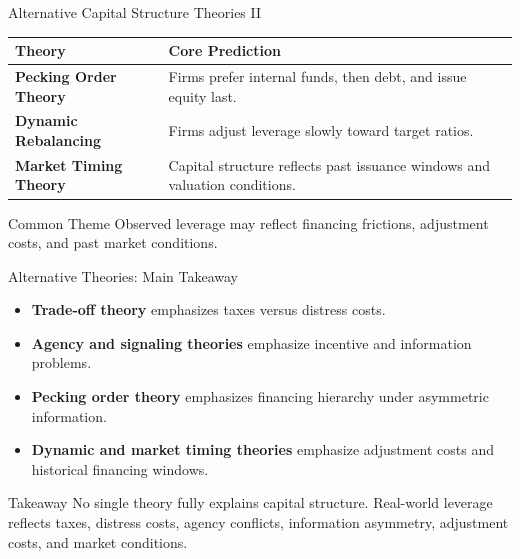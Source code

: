 \begin{frame}{Alternative Capital Structure Theories II}
\small

\begin{table}[ht]
\centering
\begin{tabular}{p{3.5cm}p{7.7cm}}
\toprule
\textbf{Theory} & \textbf{Core Prediction} \\
\midrule

\textbf{Pecking Order Theory}
{ \parencite{myers1984corporate}}
& Firms prefer internal funds, then debt, and issue equity last. \\

\addlinespace[0.35em]

\textbf{Dynamic Rebalancing}
{ \parencite{leary2005revolving}}
& Firms adjust leverage slowly toward target ratios. \\

\addlinespace[0.35em]

\textbf{Market Timing Theory}
{ \parencite{baker2002market}}
& Capital structure reflects past issuance windows and valuation conditions. \\

\bottomrule
\end{tabular}
\end{table}

\vfill

\begin{block}{Common Theme}
Observed leverage may reflect financing frictions, adjustment costs, and past market conditions.
\end{block}

\end{frame}

\begin{frame}{Alternative Theories: Main Takeaway}

\begin{itemize}
    \item \textbf{Trade-off theory} emphasizes taxes versus distress costs.
    \item \textbf{Agency and signaling theories} emphasize incentive and information problems.
    \item \textbf{Pecking order theory} emphasizes financing hierarchy under asymmetric information.
    \item \textbf{Dynamic and market timing theories} emphasize adjustment costs and historical financing windows.
\end{itemize}

\vfill

\begin{alertblock}{Takeaway}
No single theory fully explains capital structure. Real-world leverage reflects
taxes, distress costs, agency conflicts, information asymmetry, adjustment
costs, and market conditions.
\end{alertblock}

\end{frame}

